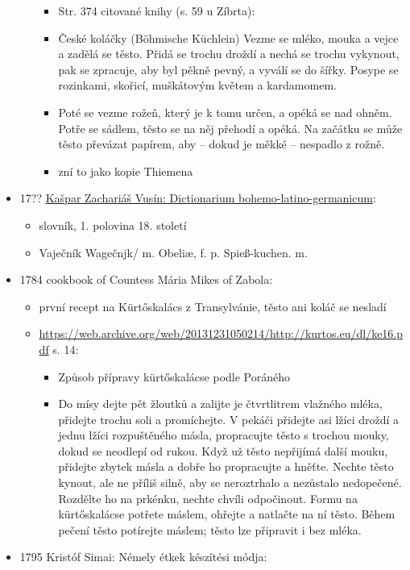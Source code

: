 \begin{itemize}
\begin{itemize}
    \begin{itemize}
    \tightlist
    \item
      Str. 374 citované knihy (s. 59 u Zíbrta):
    \item
      České koláčky (Böhmische Küchlein) Vezme se mléko, mouka a vejce a
      zadělá se těsto. Přidá se trochu droždí a nechá se trochu
      vykynout, pak se zpracuje, aby byl pěkně pevný, a vyválí se do
      šířky. Posype se rozinkami, skořicí, muškátovým květem a
      kardamomem.
    \item
      Poté se vezme rožeň, který je k tomu určen, a opéká se nad ohněm.
      Potře se sádlem, těsto se na něj přehodí a opéká. Na začátku se
      může těsto převázat papírem, aby -- dokud je měkké -- nespadlo z
      rožně.
    \item
      zní to jako kopie Thiemena
    \end{itemize}
  \end{itemize}
\item
  17??
  \href{https://bara.ujc.cas.cz/slovniky/VusSlovBLG1729/vusin22.html\#CTX14944}{Kašpar
  Zachariáš Vusín: Dictionarium bohemo-latino-germanicum}:

  \begin{itemize}
  \tightlist
  \item
    slovník, 1. polovina 18. století
  \item
    Vaječník \textbar{} Wagečnjk/ m. Obeliæ, f. p. Spieß-kuchen. m.
  \end{itemize}
\item
  1784 cookbook of Countess Mária Mikes of Zabola:

  \begin{itemize}
  \tightlist
  \item
    první recept na Kürtőskalács z Transylvánie, těsto ani koláč se
    nesladí
  \item
    \url{https://web.archive.org/web/20131231050214/http://kurtos.eu/dl/ke16.pdf}
    s. 14:

    \begin{itemize}
    \tightlist
    \item
      Způsob přípravy kürtőskalácse podle Poráného
    \item
      Do mísy dejte pět žloutků a zalijte je čtvrtlitrem vlažného mléka,
      přidejte trochu soli a promíchejte. V pekáči přidejte asi lžíci
      droždí a jednu lžíci rozpuštěného másla, propracujte těsto s
      trochou mouky, dokud se neodlepí od rukou. Když už těsto nepřijímá
      další mouku, přidejte zbytek másla a dobře ho propracujte a
      hněťte. Nechte těsto kynout, ale ne příliš silně, aby se
      neroztrhalo a nezůstalo nedopečené. Rozdělte ho na prkénku, nechte
      chvíli odpočinout. Formu na kürtőskalácse potřete máslem, ohřejte
      a natlačte na ní těsto. Během pečení těsto potírejte máslem; těsto
      lze připravit i bez mléka.
    \end{itemize}
  \end{itemize}
\item
  1795 Kristóf Simai: Némely étkek készítési módja:


\end{itemize}
